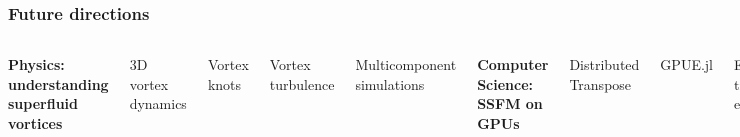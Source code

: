 \documentclass{beamer}
\begin{document}
\begin{frame}
\frametitle{Future directions}

\begin{columns}
\center
\textbf{Physics: understanding superfluid vortices}

\vspace{0.5cm}

3D vortex dynamics

\vspace{0.5cm}

Vortex knots

\vspace{0.5cm}

Vortex turbulence

\vspace{0.5cm}

Multicomponent simulations

\center

\textbf{Computer Science: SSFM on GPUs}

\vspace{0.5cm}

Distributed Transpose

\vspace{0.5cm}

GPUE.jl

\vspace{0.5cm}

Expression tree extensions

\vspace{0.5cm}

Compression methods

\end{columns}
\end{frame}
\end{document}
